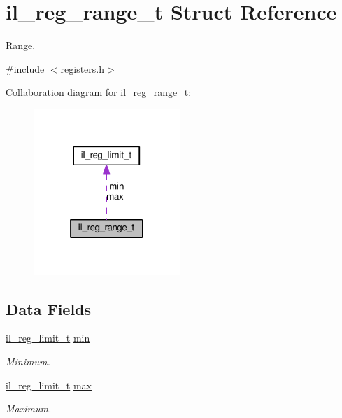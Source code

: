 \hypertarget{structil__reg__range__t}{}\section{il\+\_\+reg\+\_\+range\+\_\+t Struct Reference}
\label{structil__reg__range__t}


Range.  




{\ttfamily \#include $<$registers.\+h$>$}



Collaboration diagram for il\+\_\+reg\+\_\+range\+\_\+t\+:\nopagebreak
\begin{figure}[H]
\begin{center}
\leavevmode
\includegraphics[width=157pt]{structil__reg__range__t__coll__graph}
\end{center}
\end{figure}
\subsection*{Data Fields}
\begin{DoxyCompactItemize}
\item 
\hyperlink{unionil__reg__limit__t}{il\+\_\+reg\+\_\+limit\+\_\+t} \hyperlink{structil__reg__range__t_a5f2d3034108ba4f003dea87baaccf19c}{min}
\begin{DoxyCompactList}\small\item\em Minimum. \end{DoxyCompactList}\item 
\hyperlink{unionil__reg__limit__t}{il\+\_\+reg\+\_\+limit\+\_\+t} \hyperlink{structil__reg__range__t_aea6987fad601c38802c00a67027de135}{max}
\begin{DoxyCompactList}\small\item\em Maximum. \end{DoxyCompactList}\end{DoxyCompactItemize}


